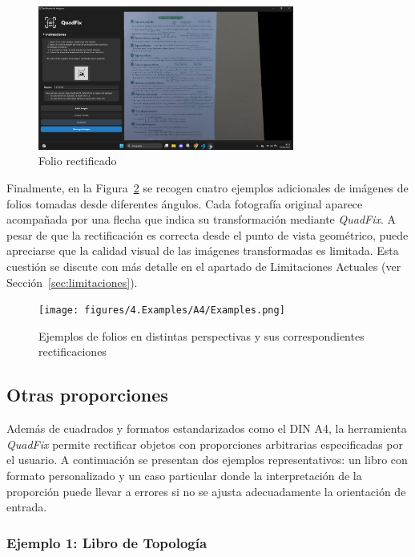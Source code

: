 \begin{figure}[H]
    \centering
    \includegraphics[width=0.75\textwidth]{figures/4.Examples/A4/Example2.png}
    \caption{Folio rectificado}
    \label{fg:folio-rectificado}
\end{figure}

Finalmente, en la Figura~\ref{fg:folios-multiples} se recogen cuatro ejemplos adicionales de imágenes de folios tomadas desde diferentes ángulos. Cada fotografía original aparece acompañada por una flecha que indica su transformación mediante \textit{QuadFix}. A pesar de que la rectificación es correcta desde el punto de vista geométrico, puede apreciarse que la calidad visual de las imágenes transformadas es limitada. Esta cuestión se discute con más detalle en el apartado de Limitaciones Actuales (ver Sección~\ref{sec:limitaciones}).

\begin{figure}[H]
    \centering
    \texttt{[image: figures/4.Examples/A4/Examples.png]}
    \caption{Ejemplos de folios en distintas perspectivas y sus correspondientes rectificaciones}
    \label{fg:folios-multiples}
\end{figure}


\subsection{Otras proporciones}

Además de cuadrados y formatos estandarizados como el DIN A4, la herramienta \textit{QuadFix} permite rectificar objetos con proporciones arbitrarias especificadas por el usuario. A continuación se presentan dos ejemplos representativos: un libro con formato personalizado y un caso particular donde la interpretación de la proporción puede llevar a errores si no se ajusta adecuadamente la orientación de entrada.

\subsubsection*{Ejemplo 1: Libro de Topología}

